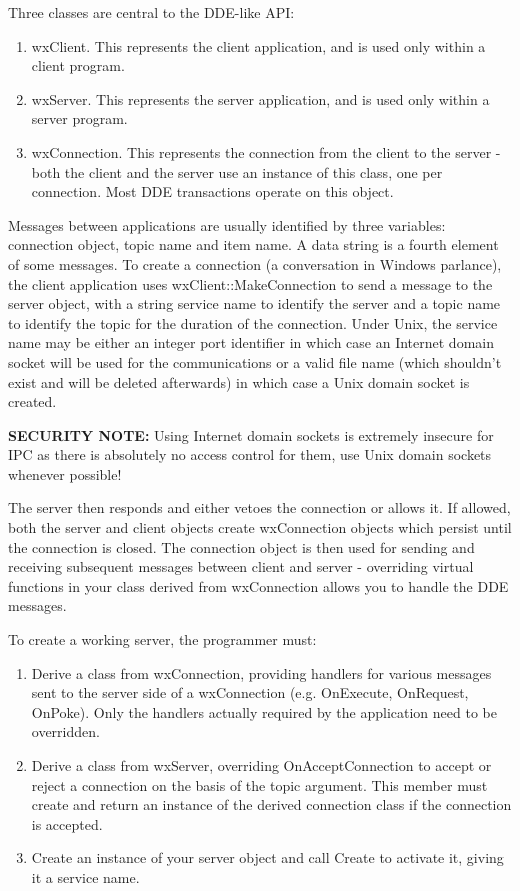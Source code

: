 Three classes are central to the DDE-like API:

\begin{enumerate}\itemsep=0pt
\item wxClient. This represents the client application, and is used
only within a client program.
\item wxServer. This represents the server application, and is used
only within a server program.
\item wxConnection. This represents the connection from the
client to the server - both the client and the server use an
instance of this class, one per connection. Most DDE transactions
operate on this object.
\end{enumerate}

Messages between applications are usually identified by three
variables: connection object, topic name and item name.  A data
string is a fourth element of some messages. To create a
connection (a conversation in Windows parlance), the client
application uses wxClient::MakeConnection to send a message to the
server object, with a string service name to identify the server
and a topic name to identify the topic for the duration of the
connection. Under Unix, the service name may be either an integer
port identifier in which case an Internet domain socket will be
used for the communications or a valid file name (which shouldn't
exist and will be deleted afterwards) in which case a Unix domain
socket is created.

{\bf SECURITY NOTE:} Using Internet domain sockets is extremely insecure for
IPC as there is absolutely no access control for them, use Unix domain sockets
whenever possible!

The server then responds and either vetoes the connection or
allows it. If allowed, both the server and client objects create
wxConnection objects which persist until the connection is
closed. The connection object is then used for sending and
receiving subsequent messages between client and server -
overriding virtual functions in your class derived from
wxConnection allows you to handle the DDE messages.

To create a working server, the programmer must:

\begin{enumerate}\itemsep=0pt
\item Derive a class from wxConnection, providing handlers for various messages sent to the server
side of a wxConnection (e.g. OnExecute, OnRequest, OnPoke). Only
the handlers actually required by the application need to be
overridden.
\item Derive a class from wxServer, overriding OnAcceptConnection
to accept or reject a connection on the basis of the topic
argument. This member must create and return an instance of the
derived connection class if the connection is accepted.
\item Create an instance of your server object and call Create to
activate it, giving it a service name.
\end{enumerate}

